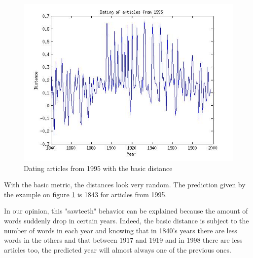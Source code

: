 \begin{figure}[H]
\begin{minipage}[b]{0.3\linewidth}
    \end{minipage}\hfill
    \begin{minipage}[b]{0.3\linewidth}
	    \includegraphics[scale=0.25]{Pictures/date_articles/distance1/dating1995_corrected.jpg}
        \caption{Dating articles from 1995 with the basic distance}
        \label{date_d1}
    \end{minipage}
\end{figure}
With the basic metric, the distances look very random. The prediction given by the example on figure \ref{date_d1} is 1843 for articles from 1995.

In our opinion, this "sawteeth" behavior can be explained because the amount of words suddenly drop in certain years. Indeed, the basic distance is subject to the number of words in each year and knowing that in 1840's years there are less words in the others and that between 1917 and 1919 and in 1998 there are less articles too, the predicted year will almost always one of the previous ones.
